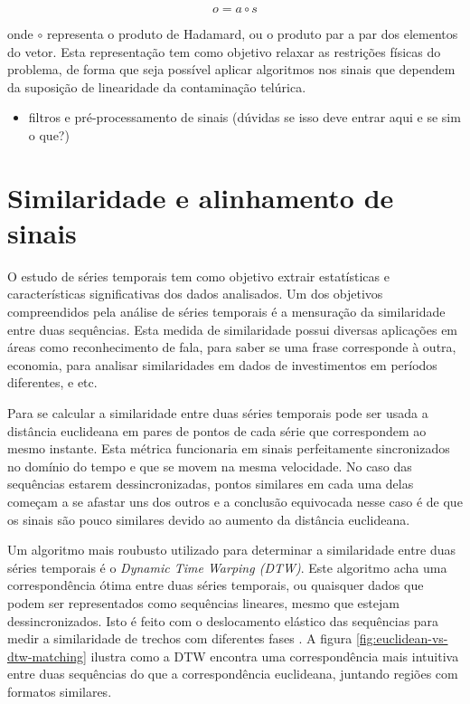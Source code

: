 \begin{equation*}
    o = a \circ s
\end{equation*}

onde $\circ$ representa o produto de Hadamard, ou o produto par a par dos elementos do vetor. Esta representação tem como objetivo relaxar as restrições físicas do problema, de forma que seja possível aplicar algoritmos nos sinais que dependem da suposição de linearidade da contaminação telúrica.


\begin{itemize}
    \item filtros e pré-processamento de sinais (dúvidas se isso deve entrar aqui e se sim o que?)
\end{itemize}


\section{Similaridade e alinhamento de sinais}

O estudo de séries temporais tem como objetivo extrair estatísticas e características significativas dos dados analisados. Um dos objetivos compreendidos pela análise de séries temporais é a mensuração da similaridade entre duas sequências. Esta medida de similaridade possui diversas aplicações em áreas como reconhecimento de fala, para saber se uma frase corresponde à outra, economia, para analisar similaridades em dados de investimentos em períodos diferentes, e etc.

Para se calcular a similaridade entre duas séries temporais pode ser usada a distância euclideana em pares de pontos de cada série que correspondem ao mesmo instante. Esta métrica funcionaria em sinais perfeitamente sincronizados no domínio do tempo e que se movem na mesma velocidade. No caso das sequências estarem dessincronizadas, pontos similares em cada uma delas começam a se afastar uns dos outros e a conclusão equivocada nesse caso é de que os sinais são pouco similares devido ao aumento da distância euclideana.

Um algoritmo mais roubusto utilizado para determinar a similaridade entre duas séries temporais é o \textit{Dynamic Time Warping (DTW)}. Este algoritmo acha uma correspondência ótima entre duas séries temporais, ou quaisquer dados que podem ser representados como sequências lineares, mesmo que estejam dessincronizados. Isto é feito com o deslocamento elástico das sequências para medir a similaridade de trechos com diferentes fases \citep{shou2005fast}. A figura \ref{fig:euclidean-vs-dtw-matching} ilustra como a DTW encontra uma correspondência mais intuitiva entre duas sequências do que a correspondência euclideana, juntando regiões com formatos similares.

